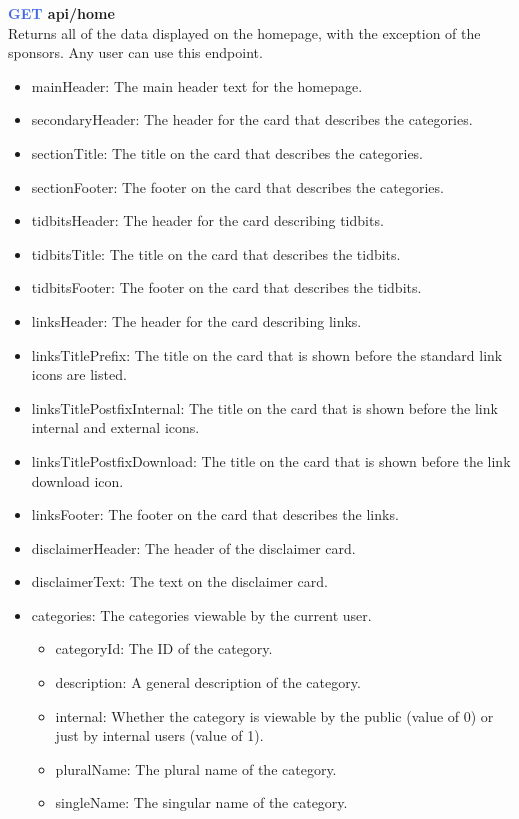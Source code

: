 \documentclass[onecolumn, draftclsnofoot,10pt, compsoc, usenames, dvipsnames]{IEEEtran}
\begin{document}
\noindent
\textbf{\textcolor{RoyalBlue}{GET} api/home} \\
Returns all of the data displayed on the homepage, with the exception of the sponsors. Any user can use this endpoint.
\begin{itemize}
    \item mainHeader: The main header text for the homepage.
    \item secondaryHeader: The header for the card that describes the categories.
    \item sectionTitle: The title on the card that describes the categories.
    \item sectionFooter: The footer on the card that describes the categories.
    \item tidbitsHeader: The header for the card describing tidbits.
    \item tidbitsTitle: The title on the card that describes the tidbits.
    \item tidbitsFooter: The footer on the card that describes the tidbits.
    \item linksHeader: The header for the card describing links.
    \item linksTitlePrefix: The title on the card that is shown before the standard link icons are listed.
    \item linksTitlePostfixInternal: The title on the card that is shown before the link internal and  external icons.
    \item linksTitlePostfixDownload: The title on the card that is shown before the link download icon.
    \item linksFooter: The footer on the card that describes the links.
    \item disclaimerHeader: The header of the disclaimer card.
    \item disclaimerText: The text on the disclaimer card.
    \item categories: The categories viewable by the current user.
    \begin{itemize}
        \item categoryId: The ID of the category.
        \item description: A general description of the category.
        \item internal: Whether the category is viewable by the public (value of 0) or just by internal users (value of 1).
        \item pluralName: The plural name of the category.
        \item singleName: The singular name of the category.
    \end{itemize}
\end{itemize}
\end{document}
